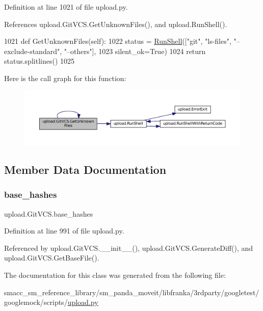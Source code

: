 Definition at line 1021 of file upload.\+py.



References upload.\+Git\+V\+C\+S.\+Get\+Unknown\+Files(), and upload.\+Run\+Shell().


\begin{DoxyCode}
1021   \textcolor{keyword}{def }GetUnknownFiles(self):
1022     status = \hyperlink{namespaceupload_adddc423c49132e8879cbb25d6be2cf11}{RunShell}([\textcolor{stringliteral}{"git"}, \textcolor{stringliteral}{"ls-files"}, \textcolor{stringliteral}{"--exclude-standard"}, \textcolor{stringliteral}{"--others"}],
1023                       silent\_ok=\textcolor{keyword}{True})
1024     \textcolor{keywordflow}{return} status.splitlines()
1025 
\end{DoxyCode}
Here is the call graph for this function\+:
\nopagebreak
\begin{figure}[H]
\begin{center}
\leavevmode
\includegraphics[width=350pt]{classupload_1_1GitVCS_ae4e8c0e9fa01619c6a5c76d1ab84b995_cgraph}
\end{center}
\end{figure}


\subsection{Member Data Documentation}
\mbox{\label{classupload_1_1GitVCS_a07e9469050a157f34fe804cdf6ecddac}} 
\subsubsection{\texorpdfstring{base\+\_\+hashes}{base\_hashes}}
{\footnotesize\ttfamily upload.\+Git\+V\+C\+S.\+base\+\_\+hashes}



Definition at line 991 of file upload.\+py.



Referenced by upload.\+Git\+V\+C\+S.\+\_\+\+\_\+init\+\_\+\+\_\+(), upload.\+Git\+V\+C\+S.\+Generate\+Diff(), and upload.\+Git\+V\+C\+S.\+Get\+Base\+File().



The documentation for this class was generated from the following file\+:\begin{DoxyCompactItemize}
\item 
smacc\+\_\+sm\+\_\+reference\+\_\+library/sm\+\_\+panda\+\_\+moveit/libfranka/3rdparty/googletest/googlemock/scripts/\hyperlink{googlemock_2scripts_2upload_8py}{upload.\+py}\end{DoxyCompactItemize}
